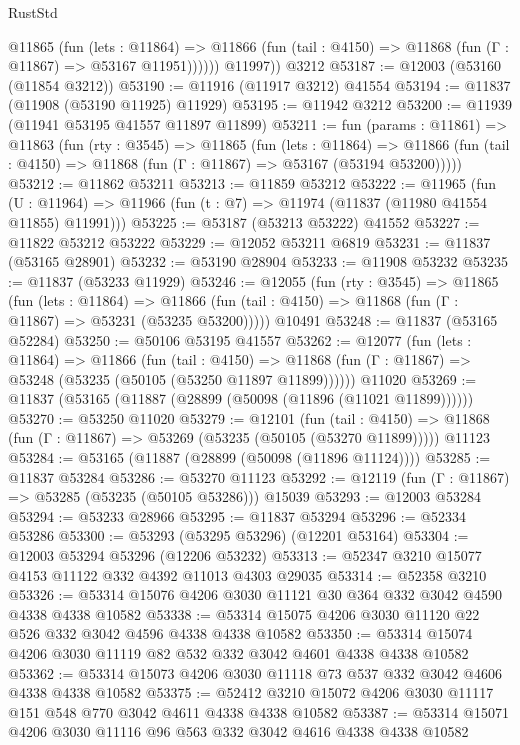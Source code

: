 \begin{lexlean}{RustStd}
\begin{coremodule}
{\begin{coremodule}
{{{{{{{{{{{{{{{{{{{{{{{{{{{{{{{{{{{{{{{{{{{{{{{{{{            @11865
              (fun (lets : @11864) =>
              @11866 (fun (tail : @4150) => @11868 (fun (Γ : @11867) => @53167 @11951))))))
        @11997))
    @3212
@53187 := @12003 (@53160 (@11854 @3212))
@53190 := @11916 (@11917 @3212) @41554
@53194 := @11837 (@11908 (@53190 @11925) @11929)
@53195 := @11942 @3212
@53200 := @11939 (@11941 @53195 @41557 @11897 @11899)
@53211 := fun (params : @11861) =>
  @11863
    (fun (rty : @3545) =>
    @11865
      (fun (lets : @11864) =>
      @11866 (fun (tail : @4150) => @11868 (fun (Γ : @11867) => @53167 (@53194 @53200)))))
@53212 := @11862 @53211
@53213 := @11859 @53212
@53222 := @11965
    (fun (U : @11964) => @11966 (fun (t : @7) => @11974 (@11837 (@11980 @41554 @11855) @11991)))
@53225 := @53187 (@53213 @53222) @41552
@53227 := @11822 @53212 @53222
@53229 := @12052 @53211 @6819
@53231 := @11837 (@53165 @28901)
@53232 := @53190 @28904
@53233 := @11908 @53232
@53235 := @11837 (@53233 @11929)
@53246 := @12055
    (fun (rty : @3545) =>
    @11865
      (fun (lets : @11864) =>
      @11866 (fun (tail : @4150) => @11868 (fun (Γ : @11867) => @53231 (@53235 @53200)))))
    @10491
@53248 := @11837 (@53165 @52284)
@53250 := @50106 @53195 @41557
@53262 := @12077
    (fun (lets : @11864) =>
    @11866
      (fun (tail : @4150) =>
      @11868 (fun (Γ : @11867) => @53248 (@53235 (@50105 (@53250 @11897 @11899))))))
    @11020
@53269 := @11837 (@53165 (@11887 (@28899 (@50098 (@11896 (@11021 @11899))))))
@53270 := @53250 @11020
@53279 := @12101
    (fun (tail : @4150) => @11868 (fun (Γ : @11867) => @53269 (@53235 (@50105 (@53270 @11899)))))
    @11123
@53284 := @53165 (@11887 (@28899 (@50098 (@11896 @11124))))
@53285 := @11837 @53284
@53286 := @53270 @11123
@53292 := @12119 (fun (Γ : @11867) => @53285 (@53235 (@50105 @53286))) @15039
@53293 := @12003 @53284
@53294 := @53233 @28966
@53295 := @11837 @53294
@53296 := @52334 @53286
@53300 := @53293 (@53295 @53296) (@12201 @53164)
@53304 := @12003 @53294 @53296 (@12206 @53232)
@53313 := @52347 @3210 @15077 @4153 @11122 @332 @4392 @11013 @4303 @29035
@53314 := @52358 @3210
@53326 := @53314 @15076 @4206 @3030 @11121 @30 @364 @332 @3042 @4590 @4338 @4338 @10582
@53338 := @53314 @15075 @4206 @3030 @11120 @22 @526 @332 @3042 @4596 @4338 @4338 @10582
@53350 := @53314 @15074 @4206 @3030 @11119 @82 @532 @332 @3042 @4601 @4338 @4338 @10582
@53362 := @53314 @15073 @4206 @3030 @11118 @73 @537 @332 @3042 @4606 @4338 @4338 @10582
@53375 := @52412 @3210 @15072 @4206 @3030 @11117 @151 @548 @770 @3042 @4611 @4338 @4338 @10582
@53387 := @53314 @15071 @4206 @3030 @11116 @96 @563 @332 @3042 @4616 @4338 @4338 @10582
}}}}}}}}}}}}}}}}}}}}}}}}}}}}}}}}}}}}}}}}}}}}}}}}}}
\end{coremodule}}
\end{coremodule}
\end{lexlean}
